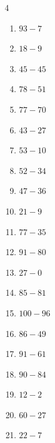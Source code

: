 \begin{multicols}{4}
\begin{enumerate}
  \item $93-7$
        \phantom{$=86$}

  \item $18-9$
        \phantom{$=9$}

\columnbreak %

\resetques

  \item $45-45$
        \phantom{$=0$}

  \item $78-51$
        \phantom{$=27$}

  \item $77-70$
        \phantom{$=7$}

  \item $43-27$
        \phantom{$=16$}

  \item $53-10$
        \phantom{$=43$}

  \item $52-34$
        \phantom{$=18$}

  \item $47-36$
        \phantom{$=11$}

  \item $21-9$
        \phantom{$=12$}

  \item $77-35$
        \phantom{$=42$}

  \item $91-80$
        \phantom{$=11$}

  \item $27-0$
        \phantom{$=27$}

  \item $85-81$
        \phantom{$=4$}

  \item $100-96$
        \phantom{$=4$}

  \item $86-49$
        \phantom{$=37$}

  \item $91-61$
        \phantom{$=30$}

  \item $90-84$
        \phantom{$=6$}

  \item $12-2$
        \phantom{$=10$}

  \item $60-27$
        \phantom{$=33$}

  \item $22-7$
        \phantom{$=15$}


\end{enumerate}
\end{multicols}

